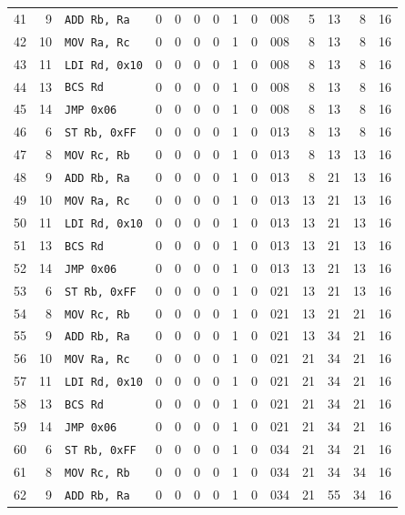 \begin{longtable}{rrlcccccc r rrrr}
41 & 9 & \texttt{ADD Rb, Ra} & 0 & 0 & 0 & 0 & 1 & 0 & 008 & 5 & 13 & 8 & 16 \\
42 & 10 & \texttt{MOV Ra, Rc} & 0 & 0 & 0 & 0 & 1 & 0 & 008 & 8 & 13 & 8 & 16 \\
43 & 11 & \texttt{LDI Rd, 0x10} & 0 & 0 & 0 & 0 & 1 & 0 & 008 & 8 & 13 & 8 & 16 \\
44 & 13 & \texttt{BCS Rd} & 0 & 0 & 0 & 0 & 1 & 0 & 008 & 8 & 13 & 8 & 16 \\
45 & 14 & \texttt{JMP 0x06} & 0 & 0 & 0 & 0 & 1 & 0 & 008 & 8 & 13 & 8 & 16 \\
46 & 6 & \texttt{ST Rb, 0xFF} & 0 & 0 & 0 & 0 & 1 & 0 & 013 & 8 & 13 & 8 & 16 \\
47 & 8 & \texttt{MOV Rc, Rb} & 0 & 0 & 0 & 0 & 1 & 0 & 013 & 8 & 13 & 13 & 16 \\
48 & 9 & \texttt{ADD Rb, Ra} & 0 & 0 & 0 & 0 & 1 & 0 & 013 & 8 & 21 & 13 & 16 \\
49 & 10 & \texttt{MOV Ra, Rc} & 0 & 0 & 0 & 0 & 1 & 0 & 013 & 13 & 21 & 13 & 16 \\
50 & 11 & \texttt{LDI Rd, 0x10} & 0 & 0 & 0 & 0 & 1 & 0 & 013 & 13 & 21 & 13 & 16 \\
51 & 13 & \texttt{BCS Rd} & 0 & 0 & 0 & 0 & 1 & 0 & 013 & 13 & 21 & 13 & 16 \\
52 & 14 & \texttt{JMP 0x06} & 0 & 0 & 0 & 0 & 1 & 0 & 013 & 13 & 21 & 13 & 16 \\
53 & 6 & \texttt{ST Rb, 0xFF} & 0 & 0 & 0 & 0 & 1 & 0 & 021 & 13 & 21 & 13 & 16 \\
54 & 8 & \texttt{MOV Rc, Rb} & 0 & 0 & 0 & 0 & 1 & 0 & 021 & 13 & 21 & 21 & 16 \\
55 & 9 & \texttt{ADD Rb, Ra} & 0 & 0 & 0 & 0 & 1 & 0 & 021 & 13 & 34 & 21 & 16 \\
56 & 10 & \texttt{MOV Ra, Rc} & 0 & 0 & 0 & 0 & 1 & 0 & 021 & 21 & 34 & 21 & 16 \\
57 & 11 & \texttt{LDI Rd, 0x10} & 0 & 0 & 0 & 0 & 1 & 0 & 021 & 21 & 34 & 21 & 16 \\
58 & 13 & \texttt{BCS Rd} & 0 & 0 & 0 & 0 & 1 & 0 & 021 & 21 & 34 & 21 & 16 \\
59 & 14 & \texttt{JMP 0x06} & 0 & 0 & 0 & 0 & 1 & 0 & 021 & 21 & 34 & 21 & 16 \\
60 & 6 & \texttt{ST Rb, 0xFF} & 0 & 0 & 0 & 0 & 1 & 0 & 034 & 21 & 34 & 21 & 16 \\
61 & 8 & \texttt{MOV Rc, Rb} & 0 & 0 & 0 & 0 & 1 & 0 & 034 & 21 & 34 & 34 & 16 \\
62 & 9 & \texttt{ADD Rb, Ra} & 0 & 0 & 0 & 0 & 1 & 0 & 034 & 21 & 55 & 34 & 16 \\

\end{longtable}
